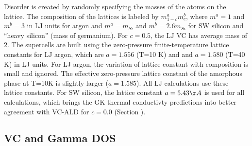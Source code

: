 \documentclass[aps,prb,onecolumn,preprint,superscriptaddress,amsmath,amssymb,floatfix]{revtex4}
\begin{document}
Disorder is created by randomly specifying the masses of the atoms 
on the lattice. 
The composition of the lattices is labeled by $m^a_{1-c}m^b_{c}$,  
where $m^a=1$ and $m^b=3$ in 
LJ units for argon and $m^a=m_{Si}$ and $m^b=2.6m_{Si}$ 
for SW silicon and ``heavy silicon'' (mass of germanium). 
For $c=0.5$, the LJ VC has average mass of 2. 
The supercells are built using 
the zero-pressure finite-temperature lattice constants 
for LJ argon, which are $a=1.556$ (T=10 K) and 
and $a=1.580$ (T=40 K) in LJ units.\cite{mcgaughey_phonon_2004} 
For LJ argon, the variation of lattice constant 
with composition is small and ignored. 
The effective zero-pressure lattice constant 
of the amorphous phase at T=10K is slightly larger 
($a = 1.585$).\cite{mcgaughey_phonon_2004}  
All LJ calculations use these lattice constants. 
For SW silicon, the lattice constant $a=5.43 \AA$ is used 
for all calculations, which brings the GK thermal conductivty 
predictions\cite{goicochea_thermal_2010} 
into better agreement with VC-ALD
\cite{sellan_cross-plane_2010} for $c=0.0$ (Section ).

\subsection{\label{S:VC Gamma DOS}VC and Gamma DOS}
\end{document}
